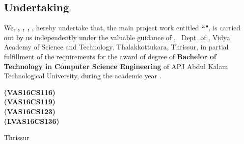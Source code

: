 %
%
%
%


\begin{titlepage}



\chapter*{\centering Undertaking}
%


\quad \quad We, {\bf \vauthora , \vauthorb , \vauthorc , \vauthord  }, hereby undertake that, the main project work entitled {\bf ``\vtitle"}, is carried out by us independently under the valuable guidance of {\bf \vguide}, \vguidedg\ Dept. of \vdept, Vidya Academy of Science and Technology, Thalakkottukara, Thrissur, in partial fulfillment of the requirements for the award of degree of {\bf Bachelor of Technology in Computer Science Engineering } of APJ Abdul Kalam Technological University, during the academic year \vacademicyear.\\[1 cm]

\begin{flushright}
{\bf \vauthora(VAS16CS116)\\
\vauthorb(VAS16CS119)\\
\vauthorc(VAS16CS123)\\
\vauthord(LVAS16CS136)\\	
}
\end{flushright}
\noindent Thrissur \\
\vdate 


\end{titlepage}




